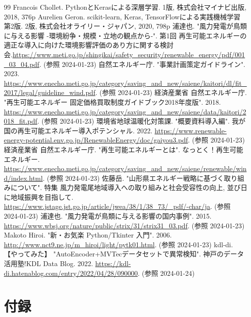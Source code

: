 \documentclass[dvipdfmx]{jsarticle}
\begin{document}
\begin{thebibliography}{99}
     Francois Chollet. PythonとKerasによる深層学習. 1版, 株式会社マイナビ出版, 2018, 376p
     Aurelien Geron. scikit-learn, Keras, TensorFlowによる実践機械学習 第2版. 2版, 株式会社オライリー・ジャパン, 2020, 798p
     浦達也.  "風力発電が鳥類に与える影響 -環境紛争・規模・立地の観点から-". 第1回 再生可能エネルギーの適正な導入に向けた環境影響評価のあり方に関する検討会.\url{https://www.meti.go.jp/shingikai/safety_security/renewable_energy/pdf/001_03_04.pdf}. (参照 2024-01-23)
     自然エネルギー庁. "事業計画策定ガイドライン". 2023. \url{https://www.enecho.meti.go.jp/category/saving_and_new/saiene/kaitori/dl/fit_2017/legal/guideline_wind.pdf}. (参照 2024-01-23)
     経済産業省 自然エネルギー庁.  "再生可能エネルギー 固定価格買取制度ガイドブック2018年度版". 2018. \url{https://www.enecho.meti.go.jp/category/saving_and_new/saiene/data/kaitori/2018_fit.pdf}. (参照 2024-01-23)
     環境省地球温暖化対策課.  "概要資料導入編". 我が国の再生可能エネルギー導入ポテンシャル. 2022. \url{https://www.renewable-energy-potential.env.go.jp/RenewableEnergy/doc/gaiyou3.pdf}. (参照 2024-01-23)
     経済産業省 自然エネルギー庁.  "再生可能エネルギーとは". なっとく！再生可能エネルギー. \url{https://www.enecho.meti.go.jp/category/saving_and_new/saiene/renewable/wind/index.html}. (参照 2024-01-23)
     佐藤岳.  "山形県エネルギー戦略に基づく取り組みについて". 特集 風力発電尾地域導入への取り組みと社会受容性の向上, 並び日に地域振興を目指して. 
    \url{https://www.jstage.jst.go.jp/article/jwea/38/1/38_73/_pdf/-char/ja}. (参照 2024-01-23)
     浦達也.  "風力発電が鳥類に与える影響の国内事例".  2015. \url{https://www.wbsj.org/nature/public/strix/31/strix31_03.pdf}. (参照 2024-01-23)
     Makoto Hiroi.  "新・お気楽 Python/Tkinter 入門".  2006. \url{http://www.nct9.ne.jp/m_hiroi/light/pytk01.html}. (参照 2024-01-23)
    kdl-di. 【やってみた】 "AutoEncoder+MVTecデータセットで異常検知". 神戸のデータ活用塾!KDL Data Blog. 2022. \url{https://kdl-di.hatenablog.com/entry/2022/04/28/090000}. (参照 2024-01-24)
\end{thebibliography}

\section{付録}
\end{document}

